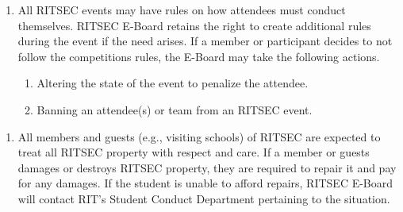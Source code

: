 \begin{enumerate}
  \item All RITSEC events may have rules on how attendees must conduct
    themselves. RITSEC E-Board retains the right to create additional rules
    during the event if the need arises. If a member or participant decides to
    not follow the competitions rules, the E-Board may take the following
    actions. 
  \begin{enumerate}
    \item Altering the state of the event to penalize the attendee.
    \item Banning an attendee(s) or team from an RITSEC event.
  \end{enumerate}
\end{enumerate}


\begin{enumerate}
  \item All members and guests (e.g., visiting schools) of RITSEC are expected
    to treat all RITSEC property with respect and care. If a member or guests
    damages or destroys RITSEC property, they are required to repair it and pay
    for any damages. If the student is unable to afford repairs, RITSEC E-Board
    will contact RIT’s Student Conduct Department pertaining to the situation.
\end{enumerate}
